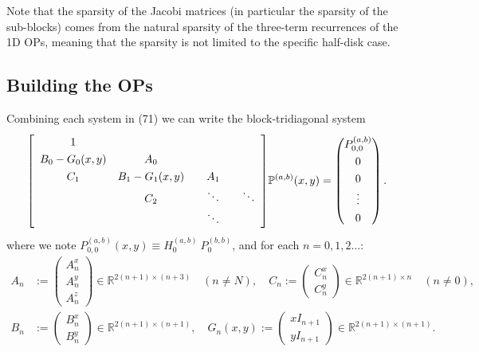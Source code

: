 \documentclass[11pt, oneside]{article}   	%
\newcommand{\R}{\mathbb{R}}
\newcommand{\bigP}{\mathbb{P}}
\newcommand{\bigPab}{\bigP^{(a,b)}}
\begin{document}
Note that the sparsity of the Jacobi matrices (in particular the sparsity of the sub-blocks) comes from the natural sparsity of the three-term recurrences of the 1D OPs, meaning that the sparsity is not limited to the specific half-disk case.




\subsection{Building the OPs} 

Combining each system in (71) we can write the block-tridiagonal system
\begin{align}
\renewcommand\arraystretch{1.3}
\mleft[
\begin{array}{cccc}
		1 & & & \\
		B_0-G_0(x,y) & A_0 & & \\
		C_1 & B_1-G_1(x,y) & \quad A_1 \quad & \\
		& C_2 & \ddots & \ddots \\
		& & \ddots &
\end{array}
\mright]
\bigPab(x,y)
=
\begin{pmatrix}
	P^{(a,b)}_{0,0} \\ 0 \\ 0 \\ \vdots \\ 0 \\
\end{pmatrix}.
\end{align}
where we note \(P^{(a,b)}_{0,0}(x,y) \equiv H_0^{(a,b)} \: P_0^{(b,b)}\), and for each $n = 0,1,2\dots$:
\begin{align}
A_n &:= \begin{pmatrix}
		A^x_n \\
		A^y_n \\
		A^z_n
	    \end{pmatrix} \in \R^{2(n+1)\times(n+3)} \quad (n \ne N), \quad
C_n := \begin{pmatrix}
		C^x_n \\
		C^y_n
	    \end{pmatrix} \in \R^{2(n+1)\times n} \quad (n \ne 0), \nonumber \\
B_n &:= \begin{pmatrix}
		B^x_n \\
		B^y_n
	    \end{pmatrix} \in \R^{2(n+1)\times(n+1)}, \quad
G_n(x,y) := \begin{pmatrix}
		xI_{n+1} \\
		yI_{n+1}
	    \end{pmatrix} \in \R^{2(n+1)\times(n+1)}.
\end{align}
 
\end{document}

